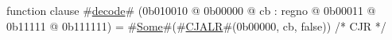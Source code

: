 function clause #\hyperref[zdecode]{decode}# (0b010010 @ 0b00000 @ cb : regno @    0b00011 @    0b11111 @ 0b111111) = #\hyperref[zSome]{Some}#(#\hyperref[zCJALR]{CJALR}#(0b00000, cb, false)) /* CJR */
